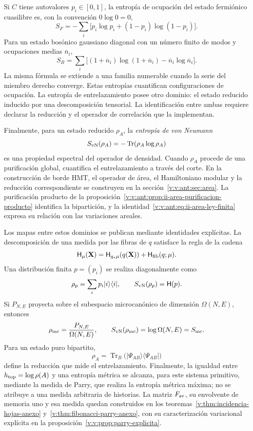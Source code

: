 Si \(C\) tiene autovalores \(p_i\in[0,1]\), la entropía de ocupación del
estado fermiónico cuasilibre es, con la convención \(0\log0=0\),
\begin{equation}
 S_F=-\sum_i\bigl[p_i\log p_i+(1-p_i)\log(1-p_i)\bigr].
 \label{v:v:rec:eq:entropia-cuasilibre-fermi-rev3}
\end{equation}
Para un estado bosónico gaussiano diagonal con un número finito de modos y
ocupaciones medias \(\overline n_i\),
\begin{equation}
 S_B=\sum_i\bigl[(1+\overline n_i)\log(1+\overline n_i)
                  -\overline n_i\log\overline n_i\bigr].
 \label{v:v:rec:eq:entropia-gaussiana-bose-rev3}
\end{equation}
La misma fórmula se extiende a una familia numerable cuando la serie del
miembro derecho converge.
Estas entropías cuantifican configuraciones de ocupación. La entropía de
entrelazamiento posee otro dominio: el estado reducido inducido por una
descomposición tensorial. La identificación entre ambas requiere declarar la
reducción y el operador de correlación que la implementan.

Finalmente, para un estado reducido \(\rho_A\), la \emph{entropía de von
Neumann}
\[
 S_{\rm vN}(\rho_A)=-\operatorname{Tr}(\rho_A\log\rho_A)
\]
es una propiedad espectral del operador de densidad. Cuando \(\rho_A\)
procede de una purificación global, cuantifica el entrelazamiento a través
del corte. En la construcción de borde HMT, el operador de área, el
Hamiltoniano modular y la reducción correspondiente se construyen en la
sección~\ref{v:v:ant:sec:area}. La purificación producto de la
proposición~\ref{v:v:ant:prop:ii-area-purificacion-producto} identifica
la bipartición, y la identidad~\eqref{v:v:ant:eq:ii-area-ley-finita}
expresa su relación con las variaciones areales.

\newpage
Los mapas entre estos dominios se publican mediante identidades explícitas.
La descomposición de una medida por las fibras de \(q\) satisface la regla de
la cadena
\begin{equation}
 \mathsf H_\mu(\mathbf X)
 =\mathsf H_{q_*\mu}(q(\mathbf X))
  +\mathsf H_{\rm fib}(q;\mu).
 \label{v:v:rec:eq:cadena-entropia-fibras-rev2}
\end{equation}
Una distribución finita \(p=(p_i)\) se realiza diagonalmente como
\[
 \rho_p=\sum_i p_i|i\rangle\langle i|,
 \qquad S_{\rm vN}(\rho_p)=\mathsf H(p).
\]
Si \(P_{N,E}\) proyecta sobre el subespacio microcanónico de dimensión
\(\Omega(N,E)\), entonces
\[
 \rho_{\rm mc}=\frac{P_{N,E}}{\Omega(N,E)},
 \qquad S_{\rm vN}(\rho_{\rm mc})=\log\Omega(N,E)=S_{\rm mc}.
\]
Para un estado puro bipartito,
\[
 \rho_A=\operatorname{Tr}_B
 \bigl(|\Psi_{AB}\rangle\langle\Psi_{AB}|\bigr)
\]
define la reducción que mide el entrelazamiento. Finalmente, la igualdad entre
\(h_{\rm top}=\log\rho(A)\) y una entropía métrica se alcanza, para este
sistema primitivo, mediante la medida de Parry, que realiza la entropía métrica
máxima; no se atribuye a una medida arbitraria de historias. La matriz
\(F_{\rm av}\), su envolvente de memoria uno y esa medida quedan
construidos en los teoremas~\ref{v:thm:incidencia-hojas-anexo}
y~\ref{v:thm:fibonacci-parry-anexo}, con su caracterización variacional
explícita en la proposición~\ref{v:v:prop:parry-explicita}.
